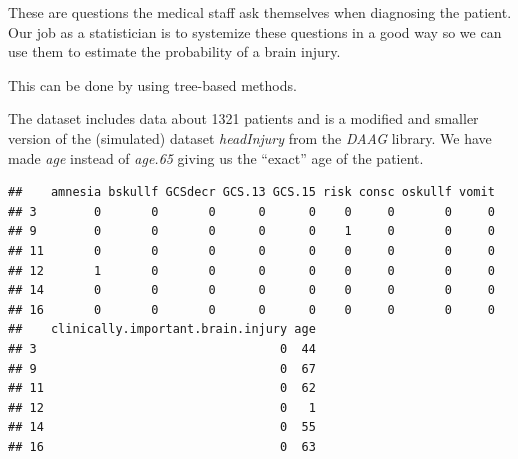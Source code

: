 \documentclass[ignorenonframetext,]{beamer}
\begin{document}
\begin{frame}

These are questions the medical staff ask themselves when diagnosing the
patient. Our job as a statistician is to systemize these questions in a
good way so we can use them to estimate the probability of a brain
injury.

This can be done by using tree-based methods.

The dataset includes data about 1321 patients and is a modified and
smaller version of the (simulated) dataset \emph{headInjury} from the
\emph{DAAG} library. We have made \emph{age} instead of \emph{age.65}
giving us the ``exact'' age of the patient.

\end{frame}

\begin{frame}[fragile]

\footnotesize

\begin{verbatim}
##    amnesia bskullf GCSdecr GCS.13 GCS.15 risk consc oskullf vomit
## 3        0       0       0      0      0    0     0       0     0
## 9        0       0       0      0      0    1     0       0     0
## 11       0       0       0      0      0    0     0       0     0
## 12       1       0       0      0      0    0     0       0     0
## 14       0       0       0      0      0    0     0       0     0
## 16       0       0       0      0      0    0     0       0     0
##    clinically.important.brain.injury age
## 3                                  0  44
## 9                                  0  67
## 11                                 0  62
## 12                                 0   1
## 14                                 0  55
## 16                                 0  63
\end{verbatim}

\normalsize

\end{frame}
\end{document}
